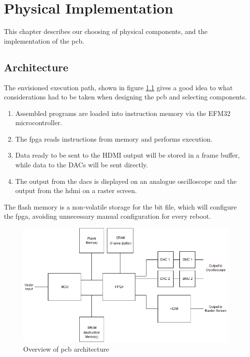 \chapter{Physical Implementation}

This chapter describes our choosing of physical components, and the implementation of the \gls{pcb}.

\section{Architecture}
The envisioned execution path, shown in figure \ref{fig:PCB_Overview} gives a good idea to what considerations had to be taken when designing the \gls{pcb} and selecting components.

\begin{enumerate}
\item Assembled \vthreek programs are loaded into instruction memory via the EFM32 microcontroller.
\item The \gls{fpga} reads instructions from memory and performs execution.
\item Data ready to be sent to the HDMI output will be stored in a frame buffer, while data to the DACs will be sent directly.
\item The output from the \gls{dac}s is displayed on an analogue oscilloscope and the output from the \gls{hdmi} on a raster screen.
\end{enumerate}

The flash memory is a non-volatile storage for the bit file, which will configure the \gls{fpga}, avoiding unnecessary manual configuration for every reboot.

\begin{figure}[h!]
\centering
\includegraphics[scale = 0.56]{images/PCB_Overview.png}
\caption{Overview of \gls{pcb} architecture}
\label{fig:PCB_Overview}
\end{figure}

